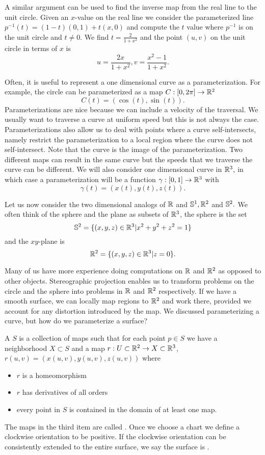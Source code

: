 A similar argument can be used to find the inverse map from
the real line to the unit circle. Given an $x$-value on the real line we consider
the parameterized line $p^{-1}(t)=(1-t)(0,1)+t(x,0)$ and compute
the $t$ value where $p^{-1}$ is on the unit circle and $t\neq 0.$ We find
$t=\frac{2}{1+x^2}$ and the point $(u,v)$ on the unit circle in terms of $x$ is
$$u=\frac{2x}{1+x^2}, v=\frac{x^2-1}{1+x^2}.$$



Often, it is useful to represent a one dimensional curve as a parameterization.
For example, the circle can be parameterized as a map $C:[0,2\pi]\rightarrow \mathbb{R}^2$
$$C(t)=\left(\cos(t),\sin(t)\right).$$ 
Parameterizations are nice because we can include a velocity of the traversal.
We usually want to traverse a curve at uniform speed but this is not always the case.
Parameterizations also allow us to deal with points where a curve self-intersects, namely 
restrict the parameterization to a local region where the curve does not self-intersect.
Note that the curve is the image of the parameterization. Two different maps can result in the same
curve but the speeds that we traverse the curve can be different.
We will also consider one dimensional curve in $\mathbb{R}^3,$ in which case a parameterization
will be a function $\gamma:[0,1]\rightarrow \mathbb{R}^3$ with
$$\gamma(t)=\left(x(t),y(t),z(t)\right).$$



Let us now consider the two dimensional analogs of $\mathbb{R}$ and $\mathbb{S}^1, \mathbb{R}^2$ and $\mathbb{S}^2.$
We often think of the sphere and the plane as subsets of $\mathbb{R}^3$,
the sphere is the set
$$\mathbb{S}^2=\{(x,y,z)\in \mathbb{R}^3 | x^2+y^2+z^2=1\}$$
and the $xy$-plane is
$$\mathbb{R}^2=\{(x,y,z)\in \mathbb{R}^3 | z=0\}.$$




Many of us have more experience doing computations on $\mathbb{R}$ and $\mathbb{R}^2$ as opposed
to other objects. Stereographic projection enables us to transform problems on
the circle and the sphere into problems in $\mathbb{R}$ and $\mathbb{R}^2$ respectively.
If we have a smooth surface, we can locally map regions to $\mathbb{R}^2$ and work there,
provided we account for any distortion introduced by the map.
We discussed parameterizing a curve, but how do we parameterize a surface?



A  $S$ is a collection of maps such that
 for each point $p\in S$ we have a neighborhood $X\subset S$
 and a map $r:U\subset \mathbb{R}^2 \to X\subset \mathbb{R}^3$, $r(u,v)=(x(u,v),y(u,v),z(u,v))$
 where
 \begin{itemize}
 \item  $r$ is a homeomorphism
 \item $r$ has derivatives of all orders
 \item every point in $S$ is contained in the domain of at least one map.

\end{itemize}
The maps in the third item are called .
Once we choose a chart we define a clockwise orientation to be positive.
 If the clockwise orientation can be consistently extended to the entire surface, we say
the surface is .


